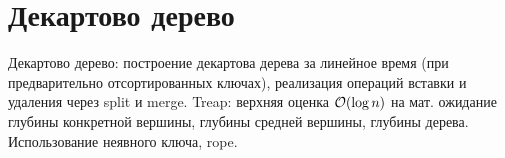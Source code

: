\section{Декартово дерево}
Декартово дерево: построение декартова дерева за линейное время
(при предварительно отсортированных ключах),
реализация операций вставки и удаления через split и merge.
Treap: верхняя оценка $\mathcal{O}(\log n)$ на мат. ожидание
глубины конкретной вершины, глубины средней вершины,
глубины дерева.
Использование неявного ключа, rope.
